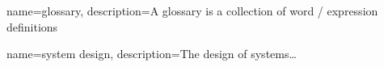 {%
	name=glossary,
	description={A glossary is a collection of word / expression
		definitions}
}

{%
	name={system design},
	description={The design of systems…}
}
